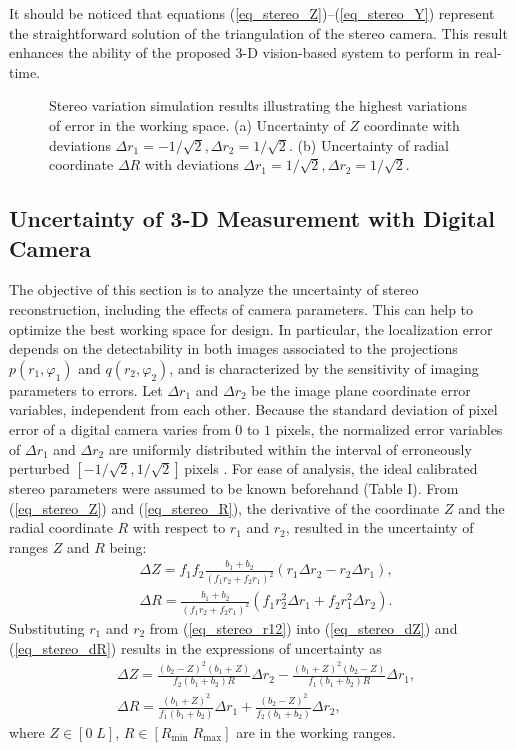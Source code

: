 \documentclass[10pt,letterpaper,journal,final,twoside,twocolumn,nofonttune]{IEEEtran}
\begin{document}
It should be noticed that equations (\ref{eq_stereo_Z})--(\ref{eq_stereo_Y}) represent the straightforward solution of the triangulation of the stereo camera. This result enhances the ability of the proposed 3-D vision-based system to perform in real-time. 
\begin{figure}[!t]
\def\svgwidth{\columnwidth}

\caption{Stereo variation simulation results illustrating the highest variations of error in the working space. (a) Uncertainty of $Z$ coordinate with deviations $\Delta r_1=-1/\sqrt{2}, \Delta r_2=1/\sqrt{2}$. (b) Uncertainty of radial coordinate $\Delta R$ with deviations $\Delta r_1=1/\sqrt{2}, \Delta r_2=1/\sqrt{2}$. }
\label{fig_variation}
\end{figure}
\subsection{Uncertainty of 3-D Measurement with Digital Camera}
The objective of this section is to analyze the uncertainty of stereo reconstruction, including the effects of camera parameters. This can help to optimize the best working space for design. In particular, the localization error depends on the detectability in both images associated to the projections $p(r_1,\varphi_1)$ and $q(r_2,\varphi_2)$, and is characterized by the sensitivity of imaging parameters to errors. Let $\Delta r_1$ and $\Delta r_2$ be the image plane coordinate error variables, independent from each other. Because the standard deviation of pixel error of a digital camera varies from $0$ to $1$ pixels, the normalized error variables of $\Delta r_1$ and $\Delta r_2$ are uniformly distributed within the interval of erroneously perturbed $[-1/\sqrt{2}, 1/\sqrt{2}]$\,pixels \cite{Das}. For ease of analysis, the ideal calibrated stereo parameters were assumed to be known beforehand (Table I). From (\ref{eq_stereo_Z}) and  (\ref{eq_stereo_R}), the derivative of the coordinate $Z$ and the radial coordinate $R$ with respect to $r_1$ and $r_2$, resulted in the uncertainty of ranges $Z$ and $R$ being:
\begin{align}
\label{eq_stereo_dZ}
&\Delta Z = f_1f_2\frac{b_1+b_2}{(f_1r_2+f_2r_1)^2}(r_1\Delta r_2-r_2\Delta r_1),\\
\label{eq_stereo_dR}
&\Delta R = \frac{b_{1} + b_{2}}{(f_1r_2+f_2r_1)^2}(f_1r^2_2\Delta r_1+f_2r^2_1\Delta r_2).
\end{align}
Substituting $r_1$ and $r_2$ from (\ref{eq_stereo_r12}) into (\ref{eq_stereo_dZ}) and (\ref{eq_stereo_dR}) results in the expressions of uncertainty as
\begin{align}
\label{eq_stereo_dZ2}
&\Delta Z =\frac{(b_2-Z)^2(b_1+Z)}{f_2(b_1+b_2)R}\Delta r_2-
\frac{(b_1+Z)^2(b_2-Z)}{f_1(b_1+b_2)R}\Delta r_1,\\
\label{eq_stereo_dR2}
&\Delta R = \frac{(b_1+Z)^2}{f_1(b_1+b_2)}\Delta r_1 + \frac{(b_2-Z)^2}{f_2(b_1+b_2)}\Delta r_2,
\end{align}
where $Z\in\left[0\;L\right]$, $R\in \left[R_{\text{min}}\;R_{\text{max}}\right]$ are in the working ranges.
\end{document}
